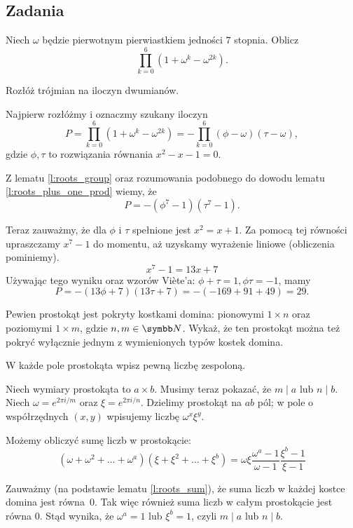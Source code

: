 \documentclass[bibliography=totocnumbered]{scrartcl}
\begin{document}
    \subsection{Zadania}
    \begin{problem}
        Niech $\omega$ będzie pierwotnym pierwiastkiem jedności $7$ stopnia. Oblicz
        $$ \prod_{k = 0}^6(1 + \omega^k - \omega^{2k}). $$
        \begin{hint}
            Rozłóż trójmian na iloczyn dwumianów.
        \end{hint}
        \begin{answer}
            Najpierw rozłóżmy i oznaczmy szukany iloczyn
            $$ P = \prod_{k = 0}^6(1 + \omega^k - \omega^{2k}) = -\prod_{k = 0}^6(\phi - \omega)(\tau - \omega), $$
            gdzie $\phi, \tau$ to rozwiązania równania $x^2 - x - 1 = 0$.

            Z lematu \ref{l:roots_group} oraz rozumowania podobnego do dowodu lematu \ref{l:roots_plus_one_prod} wiemy, że
            $$ P = -(\phi^7 - 1)(\tau^7 - 1). $$

            Teraz zauważmy, że dla $\phi$ i $\tau$ spełnione jest $x^2 = x + 1$. Za pomocą tej równości upraszczamy $x^7 - 1$ do momentu, aż uzyskamy wyrażenie liniowe (obliczenia pominiemy).
            $$ x^7 - 1 = 13x + 7 $$
            Używając tego wyniku oraz wzorów Viète'a: $\phi + \tau = 1, \phi\tau = -1$, mamy
            $$ P = -(13\phi + 7)(13\tau + 7) = -(-169 + 91 + 49) = 29. $$
        \end{answer}
    \end{problem}

    \begin{problem}
        Pewien prostokąt jest pokryty kostkami domina: pionowymi $1 \times n$ oraz poziomymi $1 \times m$, gdzie $n, m \in \NN$. Wykaż, że ten prostokąt można też pokryć wyłącznie jednym z wymienionych typów kostek domina.
        \begin{hint}
            W każde pole prostokąta wpisz pewną liczbę zespoloną.
        \end{hint}
        \begin{answer}
            Niech wymiary prostokąta to $a \times b$. Musimy teraz pokazać, że $m \mid a$ lub $n \mid b$. Niech $\omega = e^{2\pi i/m}$ oraz $\xi = e^{2\pi i/n}$. Dzielimy prostokąt na $ab$ pól; w pole o współrzędnych $(x, y)$ wpisujemy liczbę $\omega^x\xi^y$.

            Możemy obliczyć sumę liczb w prostokącie:
            $$ (\omega + \omega^2 + \ldots + \omega^a)(\xi + \xi^2 + \ldots + \xi^b) = \omega\xi\frac{\omega^a - 1}{\omega - 1}\frac{\xi^b - 1}{\xi - 1} $$

            Zauważmy (na podstawie lematu \ref{l:roots_sum}), że suma liczb w każdej kostce domina jest równa~$0$. Tak więc również suma liczb w całym prostokącie jest równa $0$. Stąd wynika, że $\omega^a = 1$ lub $\xi^b = 1$, czyli $m \mid a$ lub $n \mid b$.
        \end{answer}
    \end{problem}
\end{document}
